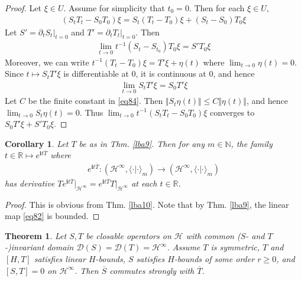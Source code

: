 \documentclass[12pt,b5paper,notitlepage]{article}
\theoremstyle{definition}
\theoremstyle{plain}
\newtheorem{thm}[df]{Theorem}
\newtheorem{co}[df]{Corollary}
\newcommand{\mc}{\mathcal}
\newcommand{\ovl}{\overline}
\newcommand{\Dom}{\scr{D}}
\newcommand{\bk}[1]{\langle {#1}\rangle}
\newcommand{\scr}{\mathscr}
\newcommand{\im}{\mathbf{i}}
\newcommand{\Nbb}{\mathbb N}
\newcommand{\Rbb}{\mathbb R}
\numberwithin{equation}{section}
\begin{document}
\begin{proof}
Let $\xi\in U$. Assume for simplicity that $t_0=0$. Then for each $\xi\in U$,
\begin{align*}
(S_t T_t-S_0T_0)\xi=S_t(T_t-T_0)\xi+(S_t-S_0)T_0\xi
\end{align*}
Let $S'=\partial_t S_t|_{t=0}$ and $T'=\partial_t T_t|_{t=0}$. Then
\begin{align*}
\lim_{t\rightarrow0}t^{-1}(S_t-S_{t_0})T_0\xi=S'T_0\xi
\end{align*}
Moreover, we can write $t^{-1}(T_t-T_0)\xi=T'\xi+\eta(t)$ where $\lim_{t\rightarrow0}\eta(t)=0$. Since $t\mapsto S_tT'\xi$ is differentiable at $0$, it is continuous at $0$, and hence
\begin{align*}
\lim_{t\rightarrow 0}S_tT'\xi=S_0T'\xi
\end{align*}
Let $C$ be the finite constant in \eqref{eq84}. Then $\Vert S_t\eta(t)\Vert\leq C\Vert\eta(t)\Vert$, and hence $\lim_{t\rightarrow 0}S_t\eta(t)=0$. Thus $\lim_{t\rightarrow0}t^{-1}(S_t T_t-S_0T_0)\xi$ converges to $S_0T'\xi+S'T_0\xi$.
\end{proof}








\begin{co}\label{lb61}
Let $T$ be as in Thm. \ref{lba9}. Then for any $m\in\Nbb$, the family $t\in\Rbb\mapsto e^{\im t\ovl T}$ where
\begin{align}\label{eq82}
e^{\im t\ovl T}:(\mc H^\infty,\bk{\cdot|\cdot}_m)\rightarrow (\mc H^\infty,\bk{\cdot|\cdot}_m)
\end{align}
has derivative $Te^{\im t\ovl T}\big|_{\mc H^\infty}=e^{\im t\ovl T}T\big|_{\mc H^\infty}$ at each $t\in\Rbb$.
\end{co}

\begin{proof}
This is obvious from Thm. \ref{lba10}. Note that by Thm. \ref{lba9}, the linear map \eqref{eq82} is bounded.
\end{proof}


	
\begin{thm}\label{lb63}
Let $S,T$ be closable operators on $\mc H$ with common ($S$- and $T$-)invariant domain $\Dom(S)=\Dom(T)=\mc H^\infty$. Assume $T$ is symmetric, $T$ and $[H,T]$ satisfies linear $H$-bounds,  $S$ satisfies $H$-bounds of some order $r\geq 0$, and $[S,T]=0$ on $\mc H^\infty$. Then $\ovl S$ commutes strongly with $\ovl T$.
\end{thm}	
	
\end{document}
